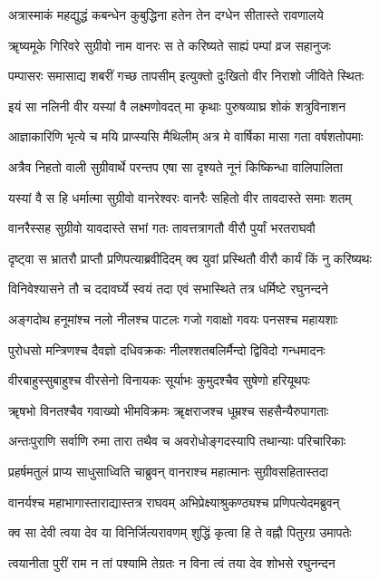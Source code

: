 \twolineshloka
{अत्रास्माकं महद्युद्धं कबन्धेन कुबुद्धिना}
{हतेन तेन दग्धेन सीतास्ते रावणालये}%

\twolineshloka
{ॠष्यमूके गिरिवरे सुग्रीवो नाम वानरः}
{स ते करिष्यते साह्यं पम्पां व्रज सहानुजः}%

\twolineshloka
{पम्पासरः समासाद्य शबरीं गच्छ तापसीम्}
{इत्युक्तो दुःखितो वीर निराशो जीविते स्थितः}%

\twolineshloka
{इयं सा नलिनी वीर यस्यां वै लक्ष्मणोवदत्}
{मा कृथाः पुरुषव्याघ्र शोकं शत्रुविनाशन}%

\twolineshloka
{आज्ञाकारिणि भृत्ये च मयि प्राप्स्यसि मैथिलीम्}
{अत्र मे वार्षिका मासा गता वर्षशतोपमाः}%

\twolineshloka
{अत्रैव निहतो वाली सुग्रीवार्थे परन्तप}
{एषा सा दृश्यते नूनं किष्किन्धा वालिपालिता}%

\twolineshloka
{यस्यां वै स हि धर्मात्मा सुग्रीवो वानरेश्वरः}
{वानरैः सहितो वीर तावदास्ते समाः शतम्}%

\twolineshloka
{वानरैस्सह सुग्रीवो यावदास्ते सभां गतः}
{तावत्तत्रागतौ वीरौ पुर्यां भरतराघवौ}%

\twolineshloka
{दृष्ट्वा स भ्रातरौ प्राप्तौ प्रणिपत्याब्रवीदिदम्}
{क्व युवां प्रस्थितौ वीरौ कार्यं किं नु करिष्यथः}%

\twolineshloka
{विनिवेश्यासने तौ च ददावर्घ्ये स्वयं तदा}
{एवं सभास्थिते तत्र धर्मिष्टे रघुनन्दने}%

\twolineshloka
{अङ्गदोथ हनूमांश्च नलो नीलश्च पाटलः}
{गजो गवाक्षो गवयः पनसश्च महायशाः}%

\twolineshloka
{पुरोधसो मन्त्रिणश्च दैवज्ञो दधिवक्रकः}
{नीलश्शतबलिर्मैन्दो द्विविदो गन्धमादनः}%

\twolineshloka
{वीरबाहुस्सुबाहुश्च वीरसेनो विनायकः}
{सूर्याभः कुमुदश्चैव सुषेणो हरियूथपः}%

\twolineshloka
{ॠषभो विनतश्चैव गवाख्यो भीमविक्रमः}
{ॠक्षराजश्च धूम्रश्च सहसैन्यैरुपागताः}%

\twolineshloka
{अन्तःपुराणि सर्वाणि रुमा तारा तथैव च}
{अवरोधोङ्गदस्यापि तथान्याः परिचारिकाः}%

\twolineshloka
{प्रहर्षमतुलं प्राप्य साधुसाध्विति चाब्रुवन्}
{वानराश्च महात्मानः सुग्रीवसहितास्तदा}%

\twolineshloka
{वानर्यश्च महाभागास्ताराद्यास्तत्र राघवम्}
{अभिप्रेक्ष्याश्रुकण्ठ्यश्च प्रणिपत्येदमब्रुवन्}%

\twolineshloka
{क्व सा देवी त्वया देव या विनिर्जित्यरावणम्}
{शुद्धिं कृत्वा हि ते वह्नौ पितुरग्र उमापतेः}%

\twolineshloka
{त्वयानीता पुरीं राम न तां पश्यामि तेग्रतः}
{न विना त्वं तया देव शोभसे रघुनन्दन}%


